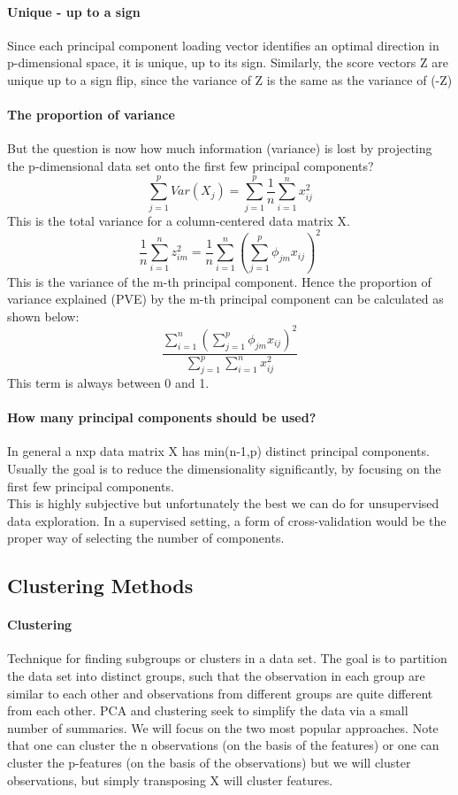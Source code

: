 \documentclass[../document.tex]{subfiles}
\begin{document}
	\paragraph{Unique - up to a sign}
	Since each principal component loading vector identifies an optimal direction in p-dimensional space, it is unique, up to its sign. Similarly, the score vectors Z are unique up to a sign flip, since the variance of Z is the same as the variance of (-Z)
	\paragraph{The proportion of variance}
	But the question is now how much information (variance) is lost by projecting the p-dimensional data set onto the first few principal components?
	\begin{equation}
		\sum_{j=1}^{p}Var(X_{j})=\sum_{j=1}^{p}\frac{1}{n}\sum_{i=1}^{n}x_{ij}^2
	\end{equation}
	This is the total variance for a column-centered data matrix X.
	\begin{equation}
		\frac{1}{n}\sum_{i=1}^{n}z_{im}^2=\frac{1}{n}\sum_{i=1}^{n}(\sum_{j=1}^{p}\phi_{jm}x_{ij})^2
	\end{equation}
	This is the variance of the m-th principal component. Hence the proportion of variance explained (PVE) by the m-th principal component can be calculated as shown below:
	\begin{equation}
		\frac{\sum_{i=1}^{n}(\sum_{j=1}^{p}\phi_{jm}x_{ij})^2}{\sum_{j=1}^{p}\sum_{i=1}^{n}x_{ij}^2}
	\end{equation}
	This term is always between 0 and 1.
	\paragraph{How many principal components should be used?}
	In general a nxp data matrix X has min(n-1,p) distinct principal components. Usually the goal is to reduce the dimensionality significantly, by focusing on the first few principal components.\\
	This is highly subjective but unfortunately the best we can do for unsupervised data exploration. In a supervised setting, a form of cross-validation would be the proper way of selecting the number of components.
	\subsection{Clustering Methods}
	\paragraph{Clustering}
	Technique for finding subgroups or clusters in a data set. The goal is to partition the data set into distinct groups, such that the observation in each group are similar to each other and observations from different groups are quite different from each other. PCA and clustering seek to simplify the data via a small number of summaries. We will focus on the two most popular approaches. Note that one can cluster the n observations (on the basis of the features) or one can cluster the p-features (on the basis of the observations) but we will cluster observations, but simply transposing X will cluster features.
\end{document}
